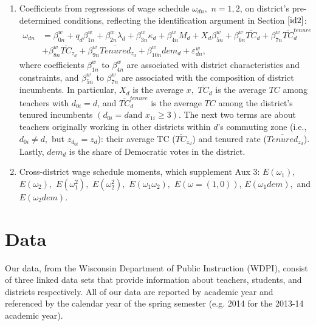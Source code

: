 \documentclass[notitlepage,12pt]{article}%
\begin{document}
\begin{enumerate}
\item[Aux 3] \label{aux3}Coefficients from regressions of wage schedule
$\omega_{dn},$ $n=1,2$, on district's pre-determined conditions, reflecting
the identification argument in Section $\ref{id2}$:%
\begin{align*}
\omega_{dn}  &  =\beta_{0n}^{w}+q_{d}\beta_{1n}^{w}+\beta_{2n}^{w}\lambda
_{d}+\beta_{3n}^{w}\kappa_{d}+\beta_{4n}^{w}M_{d}+X_{d}\beta_{5n}^{w}%
+\beta_{6n}^{w}\overline{TC}_{d}+\beta_{7n}^{w}\overline{TC}_{d}^{tenure}\\
&  +\beta_{8n}^{w}\overline{TC}_{z_{d}}+\beta_{9n}^{w}\overline{Tenured}%
_{z_{d}}+\beta_{10n}^{w}dem_{d}+\varepsilon_{dn}^{w},
\end{align*}
where coefficients $\beta_{1n}^{w}$ to $\beta_{4n}^{w}$ are associated with
district characteristics and constraints, and $\beta_{5n}^{w}$ to $\beta
_{7n}^{w}$ are associated with the composition of district incumbents. In
particular, $X_{d}$ is the average $x,$ $\overline{TC}_{d}$ is the average
$TC$ among teachers with $d_{0i}=d$, and $\overline{TC}_{d}^{tenure}$ is the
average $TC$ among the district's tenured incumbents $\left(  d_{0i}=d\text{
and }x_{1i}\geq3\right)  $. The next two terms are about teachers originally
working in other districts within $d$'s commuting zone (i.e., $d_{0i}\neq d,$
but $z_{d_{0i}}=z_{d}$): their average TC ($\overline{TC}_{z_{d}}$) and
tenured rate ($\overline{Tenured}_{z_{d}}$). Lastly, $dem_{d}$ is the share of
Democratic votes in the district.

\item[Aux 4] Cross-district wage schedule moments, which supplement Aux 3:
$E\left(  \omega_{1}\right)  ,$ $E\left(  \omega_{2}\right)  ,$ $E\left(
\omega_{1}^{2}\right)  ,$ $E\left(  \omega_{2}^{2}\right)  ,$ $E\left(
\omega_{1}\omega_{2}\right)  ,$ $E\left(  \omega=\left(  1,0\right)  \right)
$, $E\left(  \omega_{1}dem\right)  ,$ and $E\left(  \omega_{2}dem\right)  .$
\end{enumerate}

\section{Data\label{data}}

Our data, from the Wisconsin Department of Public Instruction (WDPI), consist
of three linked data sets that provide information about teachers, students,
and districts respectively. All of our data are reported by academic year and
referenced by the calendar year of the spring semester (e.g. 2014 for the
2013-14 academic year).
\end{document}
